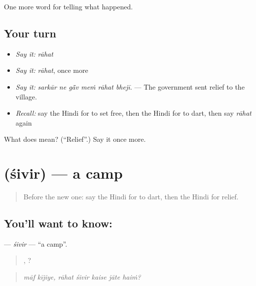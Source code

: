 \begin{grammarlens}[title={What you've built}]
One more word for telling what happened.
\end{grammarlens}

\subsection*{Your turn}
\begin{itemize}
\raggedright
  \item \emph{Say it:} \emph{rāhat}
  \item \emph{Say it:} \emph{rāhat}, once more
  \item \emph{Say it:} \emph{sarkār ne gā̃v meṁ rāhat bhejī.} — The government sent relief to the village.
  \item \emph{Recall:} say the Hindi for to set free, then the Hindi for to dart, then say \emph{rāhat} again
\end{itemize}

\begin{tcolorbox}[breakable,colback=teal!4,colframe=teal!35!black,title={Before you move on}]
What does  mean? (\textquotedblleft{}Relief\textquotedblright{}.) Say it once more.
\end{tcolorbox}
\section[\texorpdfstring{\hi{शिविर} (śivir)}{शिविर (śivir)}]{ (śivir) — a camp}

\label{lesson:HI-C309-sivir}



\begin{quote}
Before the new one: say the Hindi for to dart, then the Hindi for relief.
\end{quote}

\subsection*{You'll want to know: }
\textbf{} — \emph{śivir} — \textquotedblleft{}a camp\textquotedblright{}.

\begin{quote}
 ,     ?
\end{quote}

\begin{quote}
\emph{māf kījiye, rāhat śivir kaise jāte haiṁ?}
\end{quote}

